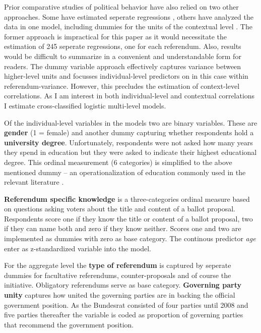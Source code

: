 \documentclass[11pt,a4paper]{article}\usepackage[]{graphicx}\usepackage[]{color}
\begin{document}
	Prior comparative studies of political behavior have also relied on two other approaches. Some have estimated seperate regressions \citep[e.g.][]{lutz_low_2007}, others have analyzed the data in one model, including dummies for the units of the contextual level 
    \citep[e.g.][]{eichenberg_europeans_1993}. The former approach is impractical for this paper as it would necessitate the estimation of 245 seperate regressions, one for each referendum. Also, results would be difficult to summarize in a convenient and understandable form for readers. The dummy variable approach effectively captures variance between higher-level units and focusses individual-level predictors on in this case within referendum-variance. However, this precludes the estimation of context-level correlations. As I am interest in both individual-level and contextual correlations I estimate cross-classified logistic multi-level models. 
    
    Of the individual-level variables in the models two are binary variables. These are \textbf{gender} (1 = female) and another dummy capturing whether respondents hold a \textbf{university degree}. Unfortunately, respondents were not asked how many years they spend in education but they were asked to indicate their highest educational degree. This ordinal measurement (6 categories) is simplified to the above mentioned dummy -- an operationalization of education commonly used in the relevant literature \citep[5]{vatter_who_2014}. 
    
    \textbf{Referendum specific knowledge} is a three-categories ordinal measure based on questions asking voters about the title and content of a ballot proposal. Respondents score one if they know the title or content of a ballot proposal, two if they can name both and zero if they know neither. Scores one and two are implemented as dummies with zero as base category. The continous predictor \textit{age} enter as z-standardized variable into the model.  
    
    
    For the aggregate level the \textbf{type of referendum} is captured by seperate dummies for facultative referendums, counter-proposals and of course the initiative. Obligatory referendums serve as base category.
    \textbf{Governing party unity} captures how united the governing parties are in backing the official government position. As the Bundesrat consisted of four parties until 2008 and five parties thereafter the variable is coded as proportion of governing parties that recommend the government position.
    
\end{document}
